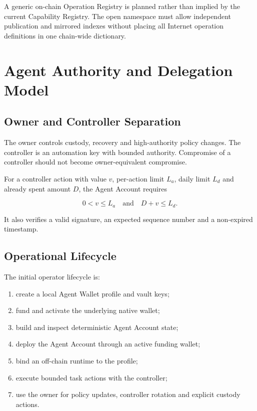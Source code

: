 \documentclass[11pt,oneside]{article}
\begin{document}
A generic on-chain Operation Registry is planned rather than implied by the current
Capability Registry. The open namespace must allow independent publication and mirrored
indexes without placing all Internet operation definitions in one chain-wide dictionary.
\section{Agent Authority and Delegation Model}

\subsection{Owner and Controller Separation}

The owner controls custody, recovery and high-authority policy changes. The controller is an
automation key with bounded authority. Compromise of a controller should not become
owner-equivalent compromise.

For a controller action with value $v$, per-action limit $L_a$, daily limit $L_d$ and already
spent amount $D$, the Agent Account requires

\[
  0 < v \leq L_a \quad\text{and}\quad D + v \leq L_d.
\]

It also verifies a valid signature, an expected sequence number and a non-expired timestamp.

\subsection{Operational Lifecycle}

The initial operator lifecycle is:

\begin{enumerate}
  \item create a local Agent Wallet profile and vault keys;
  \item fund and activate the underlying native wallet;
  \item build and inspect deterministic Agent Account state;
  \item deploy the Agent Account through an active funding wallet;
  \item bind an off-chain runtime to the profile;
  \item execute bounded task actions with the controller;
  \item use the owner for policy updates, controller rotation and explicit custody actions.
\end{enumerate}
\end{document}
